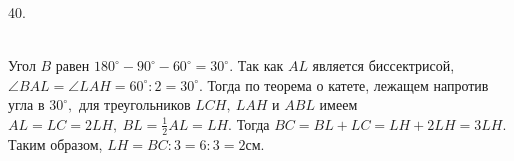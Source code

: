 40. \begin{figure}[ht!]
\end{figure}\\
Угол $B$ равен $180^\circ-90^\circ-60^\circ=30^\circ.$ Так как $AL$ является биссектрисой, $\angle BAL= \angle LAH=60^\circ:2=30^\circ.$ Тогда по теорема о катете, лежащем напротив угла в $30^\circ,$ для треугольников $LCH,\ LAH$ и $ABL$ имеем $AL=LC=2LH,\ BL=\frac{1}{2}AL=LH.$ Тогда $BC=BL+LC=LH+2LH=3LH.$ Таким образом, $LH=BC:3=6:3=2$см.\\
